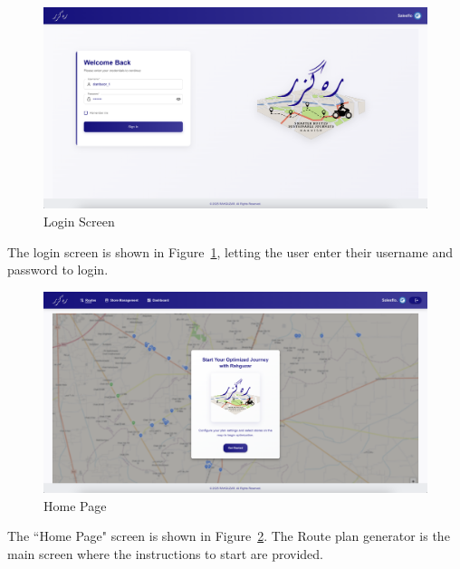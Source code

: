 \begin{figure}[H]
    \centering
    \includegraphics[width=1\textwidth]{images/Login.png} %
    \caption{Login Screen}
    \label{fig:image1}
\end{figure}
The login screen is shown in Figure~\ref{fig:image1}, letting the user enter their username and password to login.


\begin{figure}[H]
    \centering
    \includegraphics[width=1\textwidth]{images/StartScreen.png} %
    \caption{Home Page}
    \label{fig:image3}
\end{figure}
The ``Home Page" screen is shown in Figure~\ref{fig:image3}. The Route plan generator is the main screen where the instructions to start are provided.


